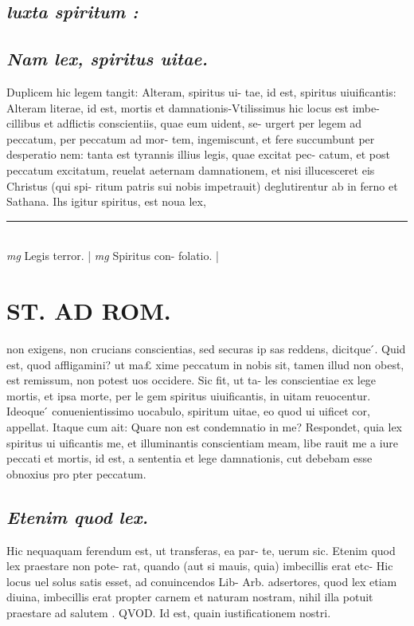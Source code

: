 \documentclass{article}
\begin{document}
\begin{pages}
\subsection*{\textit{luxta spiritum : }}
{}
\subsection*{\textit{Nam lex, spiritus uitae. }}\pstart Duplicem hic legem tangit: Alteram, spiritus ui- tae, id est, spiritus uiuificantis: Alteram literae, id est, mortis et damnationis-Vtilissimus hic locus est imbe- cillibus et adflictis conscientiis, quae eum uident, se- urgert per legem ad peccatum, per peccatum ad mor- tem, ingemiscunt, et fere succumbunt per desperatio nem: tanta est tyrannis illius legis, quae excitat pec- catum, et post peccatum excitatum, reuelat aeternam damnationem, et nisi illucesceret eis Christus (qui spi- ritum patris sui nobis impetrauit) deglutirentur ab in ferno et Sathana. Ihs igitur spiritus, est noua lex,  \pend
\vspace{0.5cm}\noindent
\vspace{0.2cm}\rule{1cm}{0.2pt}\\ 
\hspace{0.2cm}\textit{mg}
\footnotesize Legis terror.  
\normalsize| 
\hspace{0.2cm}\textit{mg}
\footnotesize Spiritus con- folatio.  
\normalsize| 
\section*{ST. AD ROM.  }
\marginpar{[ p.82 ]}\pstart non exigens, non crucians conscientias, sed securas ip sas reddens, dicitque ́. Quid est, quod affligamini? ut ma£ xime peccatum in nobis sit, tamen illud non obest, est remissum, non potest uos occidere. Sic fit, ut ta- les conscientiae ex lege mortis, et ipsa morte, per le gem spiritus uiuificantis, in uitam reuocentur. Ideoque ́ conuenientissimo uocabulo, spiritum uitae, eo quod ui uificet cor, appellat. Itaque cum ait: Quare non est condemnatio in me? Respondet, quia lex spiritus ui uificantis me, et illuminantis conscientiam meam, libe rauit me a iure peccati et mortis, id est, a sententia et lege damnationis, cut debebam esse obnoxius pro pter peccatum.  \pend
{}
{}
\subsection*{\textit{Etenim quod lex. }}\pstart Hic nequaquam ferendum est, ut transferas, ea par- te, uerum sic. Etenim quod lex praestare non pote- rat, quando (aut si mauis, quia) imbecillis erat etc- Hic locus uel solus satis esset, ad conuincendos Lib- Arb. adsertores, quod lex etiam diuina, imbecillis erat propter carnem et naturam nostram, nihil illa potuit praestare ad salutem . QVOD. Id est, quain iustificationem nostri.   \pend
{}
{}

\end{pages}
\end{document}
